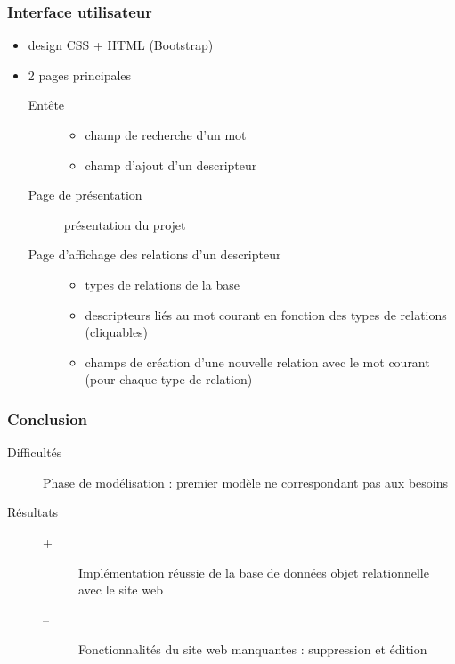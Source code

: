 \documentclass{beamer}
\begin{document}
\begin{frame}
\frametitle{Interface utilisateur}
\begin{itemize}
\item design CSS + HTML (Bootstrap)
\item 2 pages principales
\begin{description}
\item[Entête]
\begin{itemize}
\item  champ de recherche d'un mot 
\item champ d'ajout d'un descripteur 
\end{itemize}
\item[Page de présentation]présentation du projet 
\item[Page d'affichage des relations d'un descripteur]
\begin{itemize}
\item types de relations de la base
\item descripteurs liés au mot courant en fonction des types de relations (cliquables)
\item champs de création d'une nouvelle relation avec le mot courant (pour chaque type de relation)
\end{itemize}
\end{description}
\end{itemize}
\end{frame}


\begin{frame}
\frametitle{Conclusion}
\begin{description}
\item[Difficultés]Phase de modélisation : premier modèle ne correspondant pas aux besoins
\item [Résultats ] 
\begin{description}
\item[+]Implémentation réussie de la base de données objet relationnelle avec le site web
\item[--]Fonctionnalités du site web manquantes : suppression et édition 
\end{description}
\end{description}
\end{frame}
\end{document}
